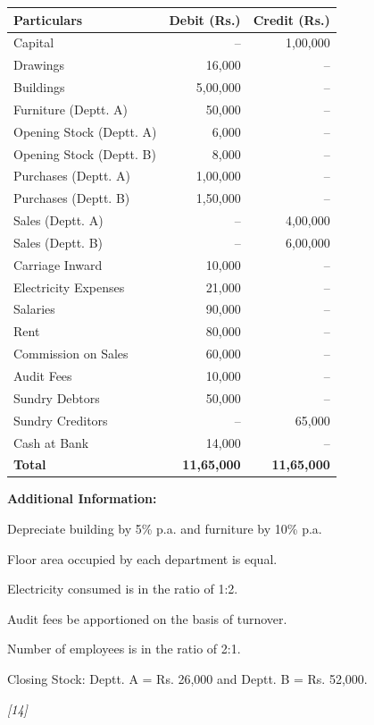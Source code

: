 \documentclass[11pt,a4paper]{article}
\newcommand{\pts}[1]{\hfill   \textit{[#1]}}
\begin{document}
\begin{center}
\small

\begin{tabular}{|l|r|r|}
\hline
   \textbf{Particulars} &   \textbf{Debit (Rs.)} &   \textbf{Credit (Rs.)} \\
\hline
Capital & -- & 1,00,000 \\
Drawings & 16,000 & -- \\
Buildings & 5,00,000 & -- \\
Furniture (Deptt. A) & 50,000 & -- \\
Opening Stock (Deptt. A) & 6,000 & -- \\
Opening Stock (Deptt. B) & 8,000 & -- \\
Purchases (Deptt. A) & 1,00,000 & -- \\
Purchases (Deptt. B) & 1,50,000 & -- \\
Sales (Deptt. A) & -- & 4,00,000 \\
Sales (Deptt. B) & -- & 6,00,000 \\
Carriage Inward & 10,000 & -- \\
Electricity Expenses & 21,000 & -- \\
Salaries & 90,000 & -- \\
Rent & 80,000 & -- \\
Commission on Sales & 60,000 & -- \\
Audit Fees & 10,000 & -- \\
Sundry Debtors & 50,000 & -- \\
Sundry Creditors & -- & 65,000 \\
Cash at Bank & 14,000 & -- \\
\hline
   \textbf{Total} &   \textbf{11,65,000} &   \textbf{11,65,000} \\
\hline
\end{tabular}
\end{center}




\noindent   \textbf{Additional Information:}

\begin{parts}
  \item Depreciate building by 5\% p.a. and furniture by 10\% p.a.
  \item Floor area occupied by each department is equal.
  \item Electricity consumed is in the ratio of 1:2.
  \item Audit fees be apportioned on the basis of turnover.
  \item Number of employees is in the ratio of 2:1.
  \item Closing Stock: Deptt. A = Rs. 26,000 and Deptt. B = Rs. 52,000.
\end{parts}\pts{14}
\end{document}
